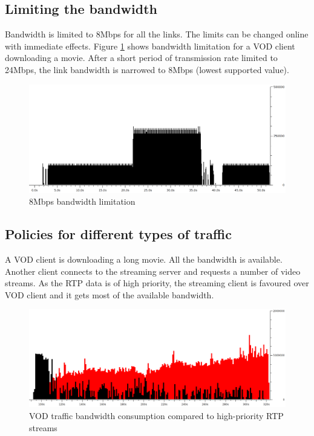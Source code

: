 \documentclass[11pt]{book}
\begin{document}
      \subsection{Limiting the bandwidth}
      \label{sub:uc:limit}

        Bandwidth is limited to 8Mbps for all the links. The limits can be changed online with immediate effects. Figure
        \ref{fig:uc:limit} shows bandwidth limitation for a VOD client downloading a movie. After a short period of
        transmission rate limited to 24Mbps, the link bandwidth is narrowed to 8Mbps (lowest supported value).

        \begin{figure}[H]
          \begin{center}
            \includegraphics[width=.7\textwidth]{img/test-case/limit.png}
          \end{center}

          \caption{8Mbps bandwidth limitation}
          \label{fig:uc:limit}
        \end{figure}


      \subsection{Policies for different types of traffic}
      \label{sub:uc:traffic}

        A VOD client is downloading a long movie. All the bandwidth is available. Another client connects to the
        streaming server and requests a number of video streams. As the RTP data is of high priority, the streaming
        client is favoured over VOD client and it gets most of the available bandwidth.

        \begin{figure}[H]
          \begin{center}
            \includegraphics[width=.7\textwidth]{img/test-case/vod-rtp.png}
          \end{center}

          \caption{VOD traffic bandwidth consumption compared to high-priority RTP streams}
        \end{figure}
\end{document}
